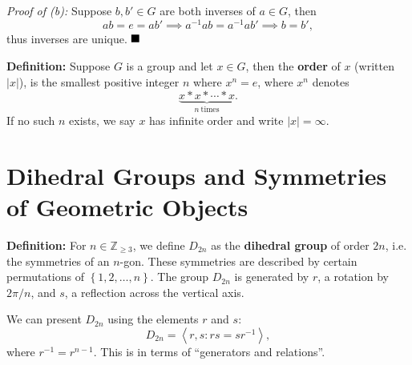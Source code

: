 \documentclass[12pt]{article}
\newcommand{\Z}{\mathbb{Z}}
\newcommand{\angleb}[1]{\left\langle#1\right\rangle}
\newcommand{\braceb}[1]{\left\{#1\right\}}
\newcommand{\vertb}[1]{\left\vert#1\right\vert}
\newcommand{\done}{\ensuremath{\strut\hfill\blacksquare}}
\begin{document}
\textit{Proof of (b):} Suppose \( b,b' \in G \) are both inverses of
\( a \in G \), then
\[
	ab = e = ab' \implies a^{-1}ab = a^{-1}ab' \implies b = b',
\]
thus inverses are unique.
\done

\textbf{Definition:} Suppose \( G \) is a group and let \( x \in G \), then
the \textbf{order} of \( x \) (written \( \vertb{x} \)), is the smallest
positive integer \( n \) where \( x^n = e \), where \( x^n \) denotes
\[
	\underbrace{x * x * \cdots * x}_{n \ \text{times}}.
\]
If no such \( n \) exists, we say \( x \) has infinite order and write
\( \vertb{x} = \infty \).

\section*{Dihedral Groups and Symmetries of Geometric Objects}

\textbf{Definition:} For \( n \in \Z_{\geq 3} \), we define
\( D_{2n} \) as the \textbf{dihedral group} of order \( 2n \), i.e. the
symmetries of an \( n \)-gon. These symmetries are described by certain
permutations of \( \braceb{1, 2, \dots, n} \). The group \( D_{2n} \) is
generated by \( r \), a rotation by \( 2\pi/n \), and \( s \), a reflection
across the vertical axis.

We can present \( D_{2n} \) using the elements \( r \) and \( s \):
\[
	D_{2n} = \angleb{r,s : rs = sr^{-1}},
\]
where \( r^{-1} = r^{n - 1} \). This is in terms of
``generators and relations''.
\end{document}
